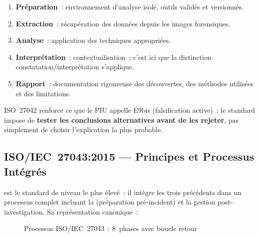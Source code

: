 \begin{enumerate}
    \item \textbf{Préparation}~: environnement d'analyse isolé, outils
          validés et versionnés.
    \item \textbf{Extraction}~: récupération des données depuis les
          images forensiques.
    \item \textbf{Analyse}~: application des techniques appropriées.
    \item \textbf{Interprétation}~: contextualisation~; c'est ici que
          la distinction constatation/interprétation s'applique.
    \item \textbf{Rapport}~: documentation rigoureuse des découvertes,
          des méthodes utilisées et des limitations.
\end{enumerate}

ISO~27042 renforce ce que le PIU appelle E9bis (falsification active)~:
le standard impose de \textbf{tester les conclusions alternatives avant
de les rejeter}, pas simplement de choisir l'explication la plus probable.

\subsection{ISO/IEC~27043:2015 --- Principes et Processus Intégrés}

 est le standard de niveau le plus élevé~:
il intègre les trois précédents dans un processus complet incluant la
 (préparation pré-incident) et la gestion
post-investigation. Sa représentation canonique~:

\begin{figure}[H]
\centering
{}
\caption{Processus ISO/IEC~27043~: 8~phases avec boucle retour}
\label{fig:iso27043}
\end{figure}

